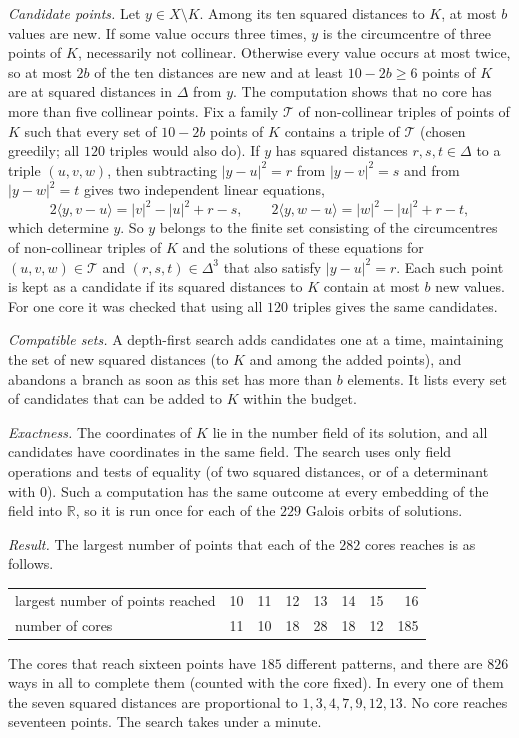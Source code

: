 \documentclass[11pt]{amsart}
\theoremstyle{definition}
\theoremstyle{remark}
\newcommand{\R}{\mathbb{R}}
\begin{document}
\emph{Candidate points.} Let $y\in X\setminus K$. Among its ten squared distances to $K$, at most $b$ values
are new. If some value occurs three times, $y$ is the circumcentre of three points of $K$, necessarily not
collinear. Otherwise every value occurs at most twice, so at most $2b$ of the ten distances are new and at
least $10-2b\ge6$ points of $K$ are at squared distances in $\Delta$ from $y$. The computation shows that no
core has more than five collinear points. Fix a family $\mathcal T$ of non-collinear triples of points of
$K$ such that every set of $10-2b$ points of $K$ contains a triple of $\mathcal T$ (chosen greedily; all
$120$ triples would also do). If $y$ has squared distances $r,s,t\in\Delta$ to a triple $(u,v,w)$, then
subtracting $|y-u|^2=r$ from $|y-v|^2=s$ and from $|y-w|^2=t$ gives two independent linear equations,
\[
  2\langle y,v-u\rangle=|v|^2-|u|^2+r-s,\qquad 2\langle y,w-u\rangle=|w|^2-|u|^2+r-t,
\]
which determine $y$. So $y$ belongs to the finite set consisting of the circumcentres of non-collinear
triples of $K$ and the solutions of these equations for $(u,v,w)\in\mathcal T$ and $(r,s,t)\in\Delta^3$ that
also satisfy $|y-u|^2=r$. Each such point is kept as a candidate if its squared distances to $K$ contain at
most $b$ new values. For one core it was checked that using all $120$ triples gives the same candidates.

\emph{Compatible sets.} A depth-first search adds candidates one at a time, maintaining the set of new
squared distances (to $K$ and among the added points), and abandons a branch as soon as this set has more
than $b$ elements. It lists every set of candidates that can be added to $K$ within the budget.

\emph{Exactness.} The coordinates of $K$ lie in the number field of its solution, and all candidates have
coordinates in the same field. The search uses only field operations and tests of equality (of two squared
distances, or of a determinant with $0$). Such a computation has the same outcome at every embedding of the
field into $\R$, so it is run once for each of the $229$ Galois orbits of solutions.

\emph{Result.} The largest number of points that each of the $282$ cores reaches is as follows.
\begin{center}
\begin{tabular}{@{}lrrrrrrr@{}}
\toprule
largest number of points reached & 10 & 11 & 12 & 13 & 14 & 15 & 16\\
number of cores & 11 & 10 & 18 & 28 & 18 & 12 & 185\\
\bottomrule
\end{tabular}
\end{center} The cores that reach sixteen points have $185$ different patterns, and there
are $826$ ways in all to complete them (counted with the core fixed). In every one of them the seven squared
distances are proportional to $1,3,4,7,9,12,13$. No core reaches seventeen points. The search takes under a
minute.
\end{document}
